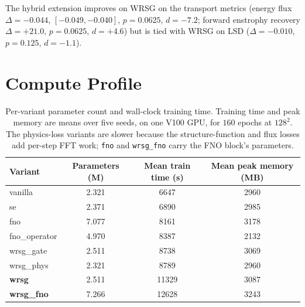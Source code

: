 \documentclass[10pt]{article} %
\begin{document}
The hybrid extension improves on WRSG on the transport metrics (energy flux $\Delta = -0.044$, $[-0.049, -0.040]$, $p=0.0625$, $d=-7.2$; forward enstrophy recovery $\Delta = +21.0$, $p=0.0625$, $d=+4.6$) but is tied with WRSG on LSD ($\Delta = -0.010$, $p=0.125$, $d=-1.1$).

\section{Compute Profile}
\label{app:compute}

\begin{table}[H]
\centering
\caption{Per-variant parameter count and wall-clock training time. Training time and peak memory are means over five seeds, on one V100 GPU, for $160$ epochs at $128^2$. The physics-loss variants are slower because the structure-function and flux losses add per-step FFT work; \texttt{fno} and \texttt{wrsg\_fno} carry the FNO block's parameters.}
\label{tab:compute}
\begin{tabular}{lccc}
\toprule
Variant & Parameters (M) & Mean train time (s) & Mean peak memory (MB) \\
\midrule
vanilla         & 2.321 & 6647  & 2960 \\
se              & 2.371 & 6890  & 2985 \\
fno             & 7.077 & 8161  & 3178 \\
fno\_operator   & 4.970 & 8387  & 2132 \\
wrsg\_gate      & 2.511 & 8738  & 3069 \\
wrsg\_phys      & 2.321 & 8789  & 2960 \\
\textbf{wrsg}   & 2.511 & 11329 & 3087 \\
\textbf{wrsg\_fno} & 7.266 & 12628 & 3243 \\
\bottomrule
\end{tabular}
\end{table}
\end{document}
